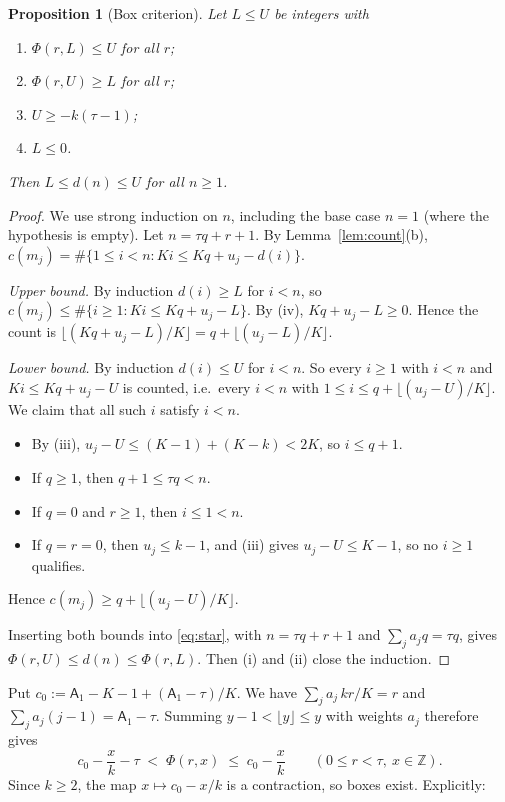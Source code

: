 \documentclass[11pt]{amsart}
\newtheorem{proposition}[theorem]{Proposition}
\theoremstyle{definition}
\theoremstyle{remark}
\newcommand{\Z}{\mathbb{Z}}
\begin{document}
\begin{proposition}[Box criterion]\label{prop:box}
Let $L\le U$ be integers with
\begin{enumerate}
\item[(i)] $\Phi(r,L)\le U$ for all $r$;
\item[(ii)] $\Phi(r,U)\ge L$ for all $r$;
\item[(iii)] $U\ge-k(\tau-1)$;
\item[(iv)] $L\le0$.
\end{enumerate}
Then $L\le d(n)\le U$ for all $n\ge1$.
\end{proposition}

\begin{proof}
We use strong induction on $n$, including the base case $n=1$ (where the hypothesis is empty). Let $n=\tau q+r+1$. By Lemma~\ref{lem:count}(b), $c(m_j)=\#\{1\le i<n: Ki\le Kq+u_j-d(i)\}$.

\emph{Upper bound.} By induction $d(i)\ge L$ for $i<n$, so $c(m_j)\le\#\{i\ge1:Ki\le Kq+u_j-L\}$. By (iv), $Kq+u_j-L\ge0$. Hence the count is $\lfloor (Kq+u_j-L)/K\rfloor=q+\lfloor(u_j-L)/K\rfloor$.

\emph{Lower bound.} By induction $d(i)\le U$ for $i<n$. So every $i\ge1$ with $i<n$ and $Ki\le Kq+u_j-U$ is counted, i.e.\ every $i<n$ with $1\le i\le q+\lfloor(u_j-U)/K\rfloor$. We claim that all such $i$ satisfy $i<n$.
\begin{itemize}
\item By (iii), $u_j-U\le (K-1)+(K-k)<2K$, so $i\le q+1$.
\item If $q\ge1$, then $q+1\le\tau q<n$.
\item If $q=0$ and $r\ge1$, then $i\le1<n$.
\item If $q=r=0$, then $u_j\le k-1$, and (iii) gives $u_j-U\le K-1$, so no $i\ge1$ qualifies.
\end{itemize}
Hence $c(m_j)\ge q+\lfloor(u_j-U)/K\rfloor$.

Inserting both bounds into \eqref{eq:star}, with $n=\tau q+r+1$ and $\sum_ja_jq=\tau q$, gives $\Phi(r,U)\le d(n)\le\Phi(r,L)$. Then (i) and (ii) close the induction.
\end{proof}

Put $c_0:=\mathsf A_1-K-1+(\mathsf A_1-\tau)/K$. We have $\sum_ja_j\,kr/K=r$ and $\sum_ja_j(j-1)=\mathsf A_1-\tau$. Summing $y-1<\lfloor y\rfloor\le y$ with weights $a_j$ therefore gives
\begin{equation}\label{eq:Phibounds}
c_0-\frac{x}{k}-\tau\;<\;\Phi(r,x)\;\le\;c_0-\frac xk\qquad(0\le r<\tau,\ x\in\Z).
\end{equation}
Since $k\ge2$, the map $x\mapsto c_0-x/k$ is a contraction, so boxes exist. Explicitly:
\end{document}
